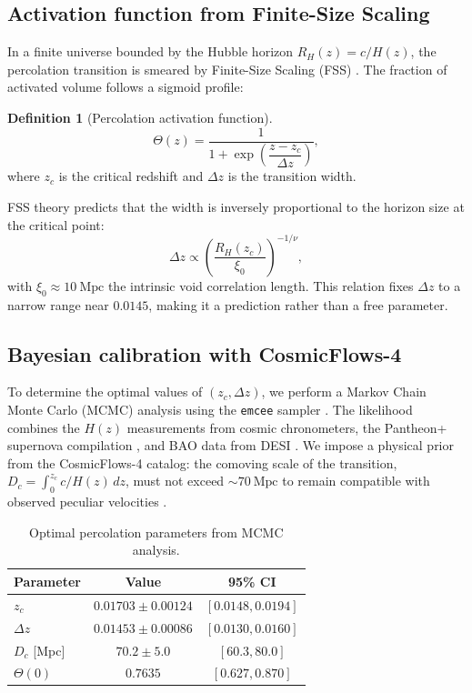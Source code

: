 \documentclass[12pt,a4paper]{article}
\theoremstyle{plain}
\theoremstyle{definition}
\newtheorem{definition}[theorem]{Definition}
\theoremstyle{remark}
\begin{document}
\subsection{Activation function from Finite-Size Scaling}
In a finite universe bounded by the Hubble horizon \(R_H(z) = c/H(z)\), the percolation transition is smeared by Finite-Size Scaling (FSS) \cite{Cardy1996}. The fraction of activated volume follows a sigmoid profile:

\begin{definition}[Percolation activation function]
\begin{equation}
\Theta(z) = \frac{1}{1 + \exp\left(\dfrac{z - z_c}{\Delta z}\right)},
\label{eq:Theta}
\end{equation}
where \(z_c\) is the critical redshift and \(\Delta z\) is the transition width.
\end{definition}

FSS theory predicts that the width is inversely proportional to the horizon size at the critical point:
\begin{equation}
\Delta z \propto \left(\frac{R_H(z_c)}{\xi_0}\right)^{-1/\nu},
\label{eq:FSS}
\end{equation}
with \(\xi_0 \approx 10\ \text{Mpc}\) the intrinsic void correlation length. This relation fixes \(\Delta z\) to a narrow range near \(0.0145\), making it a prediction rather than a free parameter.

\subsection{Bayesian calibration with CosmicFlows-4}
To determine the optimal values of \((z_c, \Delta z)\), we perform a Markov Chain Monte Carlo (MCMC) analysis using the \texttt{emcee} sampler \cite{ForemanMackey2013}. The likelihood combines the \(H(z)\) measurements from cosmic chronometers, the Pantheon+ supernova compilation \cite{Brout2022}, and BAO data from DESI \cite{DESI2024}. We impose a physical prior from the CosmicFlows-4 catalog: the comoving scale of the transition, \(D_c = \int_0^{z_c} c/H(z)\, dz\), must not exceed \(\sim70\ \text{Mpc}\) to remain compatible with observed peculiar velocities \cite{Mazurenko2024}.

\begin{table}[H]
\centering
\caption{Optimal percolation parameters from MCMC analysis.}
\label{tab:parameters}
\begin{tabular}{lcc}
\toprule
Parameter & Value & 95\% CI \\
\midrule
\(z_c\) & \(0.01703 \pm 0.00124\) & \([0.0148, 0.0194]\) \\
\(\Delta z\) & \(0.01453 \pm 0.00086\) & \([0.0130, 0.0160]\) \\
\(D_c\) [Mpc] & \(70.2 \pm 5.0\) & \([60.3, 80.0]\) \\
\(\Theta(0)\) & \(0.7635\) & \([0.627, 0.870]\) \\
\bottomrule
\end{tabular}
\end{table}
\end{document}
